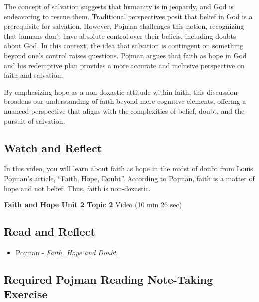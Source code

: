 \documentclass[
]{book}
\providecommand{\tightlist}{%
  \setlength{\itemsep}{0pt}\setlength{\parskip}{0pt}}
\begin{document}
The concept of salvation suggests that humanity is in jeopardy, and God is endeavoring to rescue them. Traditional perspectives posit that belief in God is a prerequisite for salvation. However, Pojman challenges this notion, recognizing that humans don't have absolute control over their beliefs, including doubts about God. In this context, the idea that salvation is contingent on something beyond one's control raises questions. Pojman argues that faith as hope in God and his redemptive plan provides a more accurate and inclusive perspective on faith and salvation.

By emphasizing hope as a non-doxastic attitude within faith, this discussion broadens our understanding of faith beyond mere cognitive elements, offering a nuanced perspective that aligns with the complexities of belief, doubt, and the pursuit of salvation.

\hypertarget{watch-and-reflect-10}{%
\subsection*{Watch and Reflect}\label{watch-and-reflect-10}}

In this video, you will learn about faith as hope in the midst of doubt from Louis Pojman's article, ``Faith, Hope, Doubt''. According to Pojman, faith is a matter of hope and not belief. Thus, faith is non-doxastic.

\textbf{Faith and Hope Unit 2 Topic 2} Video (10 min 26 sec)

\hypertarget{read-and-reflect-4}{%
\subsection*{Read and Reflect}\label{read-and-reflect-4}}

\begin{itemize}
\tightlist
\item
  Pojman - \href{assets/u2/PHIL-100-Pojman-Faith-Hope-and-Doubt.pdf}{\emph{Faith, Hope and Doubt}}
\end{itemize}

\hypertarget{required-pojman-reading-note-taking-exercise}{%
\subsection*{Required Pojman Reading Note-Taking Exercise}\label{required-pojman-reading-note-taking-exercise}}
\end{document}
